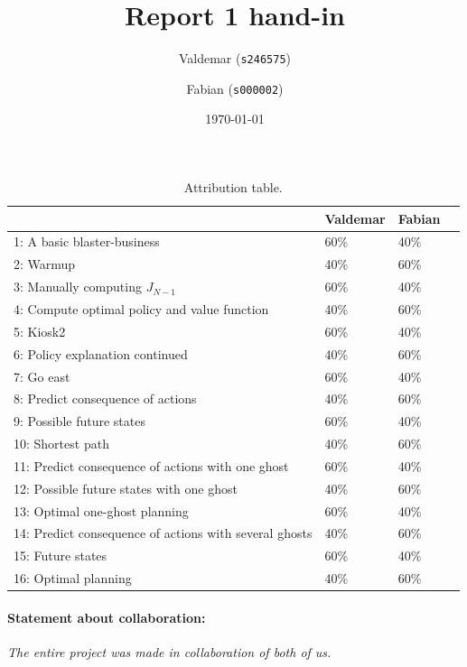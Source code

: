 \documentclass[12pt]{article}
\title{ Report 1 hand-in }
\date{ \today }
\author{Valdemar (\texttt{s246575})\and  Fabian (\texttt{s000002})}
\begin{document}
\maketitle

\begin{table}[ht!]
\caption{Attribution table.}
\begin{tabular}{llll}
\toprule
                                                        & Valdemar & Fabian   \\
\midrule
 1: A basic blaster-business                            & 60\%  & 40\%  \\
 2: Warmup                                              & 40\%  & 60\%  \\
 3: Manually computing $J_{N-1}$                        & 60\%  & 40\%  \\
 4: Compute optimal policy and value function           & 40\%  & 60\%  \\
 5: Kiosk2                                              & 60\%  & 40\%  \\
 6: Policy explanation continued                        & 40\%  & 60\%  \\
 7: Go east                                             & 60\%  & 40\%  \\
 8: Predict consequence of actions                      & 40\%  & 60\%  \\
 9: Possible future states                              & 60\%  & 40\%  \\
 10: Shortest path                                      & 40\%  & 60\%  \\
 11: Predict consequence of actions with one ghost      & 60\%  & 40\%  \\
 12: Possible future states with one ghost              & 40\%  & 60\%  \\
 13: Optimal one-ghost planning                         & 60\%  & 40\%  \\
 14: Predict consequence of actions with several ghosts & 40\%  & 60\%  \\
 15: Future states                                      & 60\%  & 40\%  \\
 16: Optimal planning                                   & 40\%  & 60\%  \\
\bottomrule
\end{tabular}
\end{table}

\paragraph{Statement about collaboration:}
\emph{The entire project was made in collaboration of both of us.}
\end{document}

